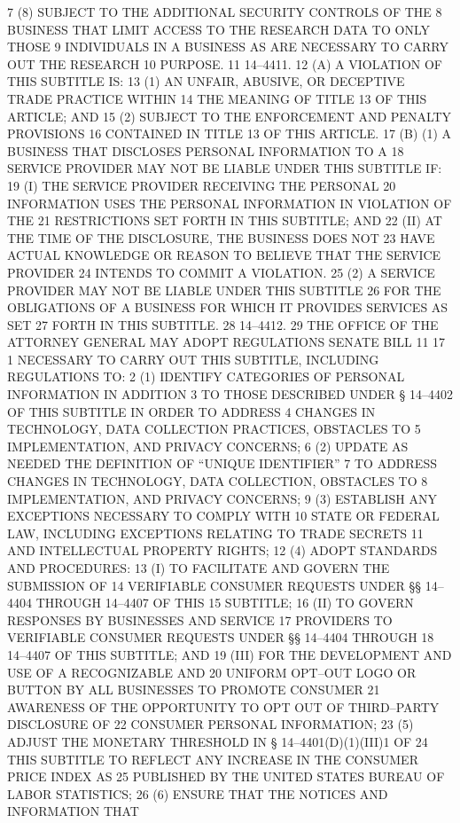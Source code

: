 7 (8) SUBJECT TO THE ADDITIONAL SECURITY CONTROLS OF THE
8 BUSINESS THAT LIMIT ACCESS TO THE RESEARCH DATA TO ONLY THOSE
9 INDIVIDUALS IN A BUSINESS AS ARE NECESSARY TO CARRY OUT THE RESEARCH
10 PURPOSE.
11 14–4411.
12 (A) A VIOLATION OF THIS SUBTITLE IS:
13 (1) AN UNFAIR, ABUSIVE, OR DECEPTIVE TRADE PRACTICE WITHIN
14 THE MEANING OF TITLE 13 OF THIS ARTICLE; AND
15 (2) SUBJECT TO THE ENFORCEMENT AND PENALTY PROVISIONS
16 CONTAINED IN TITLE 13 OF THIS ARTICLE.
17 (B) (1) A BUSINESS THAT DISCLOSES PERSONAL INFORMATION TO A
18 SERVICE PROVIDER MAY NOT BE LIABLE UNDER THIS SUBTITLE IF:
19 (I) THE SERVICE PROVIDER RECEIVING THE PERSONAL
20 INFORMATION USES THE PERSONAL INFORMATION IN VIOLATION OF THE
21 RESTRICTIONS SET FORTH IN THIS SUBTITLE; AND
22 (II) AT THE TIME OF THE DISCLOSURE, THE BUSINESS DOES NOT
23 HAVE ACTUAL KNOWLEDGE OR REASON TO BELIEVE THAT THE SERVICE PROVIDER
24 INTENDS TO COMMIT A VIOLATION.
25 (2) A SERVICE PROVIDER MAY NOT BE LIABLE UNDER THIS SUBTITLE
26 FOR THE OBLIGATIONS OF A BUSINESS FOR WHICH IT PROVIDES SERVICES AS SET
27 FORTH IN THIS SUBTITLE.
28 14–4412.
29 THE OFFICE OF THE ATTORNEY GENERAL MAY ADOPT REGULATIONS 
SENATE BILL 11 17
1 NECESSARY TO CARRY OUT THIS SUBTITLE, INCLUDING REGULATIONS TO:
2 (1) IDENTIFY CATEGORIES OF PERSONAL INFORMATION IN ADDITION
3 TO THOSE DESCRIBED UNDER § 14–4402 OF THIS SUBTITLE IN ORDER TO ADDRESS
4 CHANGES IN TECHNOLOGY, DATA COLLECTION PRACTICES, OBSTACLES TO
5 IMPLEMENTATION, AND PRIVACY CONCERNS;
6 (2) UPDATE AS NEEDED THE DEFINITION OF “UNIQUE IDENTIFIER”
7 TO ADDRESS CHANGES IN TECHNOLOGY, DATA COLLECTION, OBSTACLES TO
8 IMPLEMENTATION, AND PRIVACY CONCERNS;
9 (3) ESTABLISH ANY EXCEPTIONS NECESSARY TO COMPLY WITH
10 STATE OR FEDERAL LAW, INCLUDING EXCEPTIONS RELATING TO TRADE SECRETS
11 AND INTELLECTUAL PROPERTY RIGHTS;
12 (4) ADOPT STANDARDS AND PROCEDURES:
13 (I) TO FACILITATE AND GOVERN THE SUBMISSION OF
14 VERIFIABLE CONSUMER REQUESTS UNDER §§ 14–4404 THROUGH 14–4407 OF THIS
15 SUBTITLE;
16 (II) TO GOVERN RESPONSES BY BUSINESSES AND SERVICE
17 PROVIDERS TO VERIFIABLE CONSUMER REQUESTS UNDER §§ 14–4404 THROUGH
18 14–4407 OF THIS SUBTITLE; AND
19 (III) FOR THE DEVELOPMENT AND USE OF A RECOGNIZABLE AND
20 UNIFORM OPT–OUT LOGO OR BUTTON BY ALL BUSINESSES TO PROMOTE CONSUMER
21 AWARENESS OF THE OPPORTUNITY TO OPT OUT OF THIRD–PARTY DISCLOSURE OF
22 CONSUMER PERSONAL INFORMATION;
23 (5) ADJUST THE MONETARY THRESHOLD IN § 14–4401(D)(1)(III)1 OF
24 THIS SUBTITLE TO REFLECT ANY INCREASE IN THE CONSUMER PRICE INDEX AS
25 PUBLISHED BY THE UNITED STATES BUREAU OF LABOR STATISTICS;
26 (6) ENSURE THAT THE NOTICES AND INFORMATION THAT
